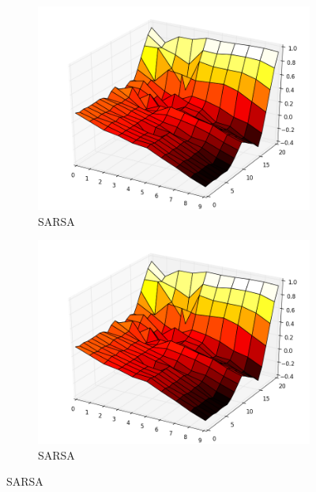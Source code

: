 \documentclass[12pt,a4paper]{article}
\begin{document}
{\begin{figure}
	\begin{subfigure}{.4\textwidth}
		\centering
		\includegraphics[width=.8\linewidth]{Easy21_Results/Sarsa_value_1e6.png}
		\caption{\label{E21_S_V} SARSA}
	\end{subfigure}%
	\begin{subfigure}{.4\textwidth}
	\centering
	\includegraphics[width=.8\linewidth]{Easy21_Results/Sarsa_value_1e6.png}
	\caption{\label{E21_S_V} SARSA}
	\end{subfigure}%



\end{figure}}
\end{document}
